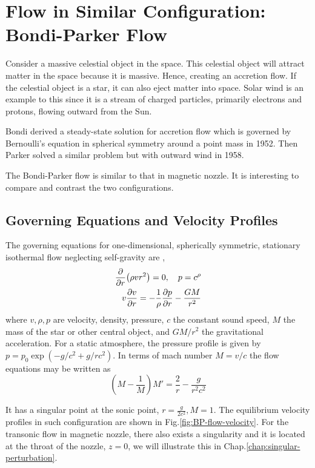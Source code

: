 \section{Flow in Similar Configuration: Bondi-Parker Flow}
Consider a massive celestial object in the space. This celestial object will attract matter in the space because it is massive. Hence, creating an accretion flow. If the celestial object is a star, it can also eject matter into space. Solar wind is an example to this since it is a stream of charged particles, primarily electrons and protons, flowing outward from the Sun.

Bondi derived a steady-state solution for accretion flow which is governed by Bernoulli's equation in spherical symmetry around a point mass in 1952. Then Parker solved a similar problem but with outward wind in 1958. \cite{aikawa_stability_1979,bondi_spherically_1952,keto_stability_2020}

The Bondi-Parker flow is similar to that in magnetic nozzle. It is interesting to compare and contrast the two configurations.

\subsection{Governing Equations and Velocity Profiles}
The governing equations for one-dimensional, spherically symmetric, stationary isothermal flow neglecting self-gravity are \cite{velli_hydrodynamics_2001},
\begin{align*} \label{eq:bondi-parker}
	\pdv{r}(\rho vr^2) = 0, \quad p = c^\rho \\
	v\pdv{v}{r} = -\frac{1}{\rho}\pdv{p}{r} - \frac{GM}{r^2}
\end{align*}
where $v,\rho,p$ are velocity, density, pressure, $c$ the constant sound speed, $M$ the mass of the star or other central object, and $GM/r^2$ the gravitational acceleration. For a static atmosphere, the pressure profile is given by $p=p_0\exp(-g/c^2 + g/rc^2)$. In terms of mach number $M=v/c$ the flow equations may be written as
\[ \left(M - \frac{1}{M}\right)M' = \frac{2}{r} - \frac{g}{r^2c^2} \]

It has a singular point at the sonic point, $r=\frac{g}{2c^2}, M=1$. The equilibrium velocity profiles in such configuration are shown in Fig.\ref{fig:BP-flow-velocity}. For the transonic flow in magnetic nozzle, there also exists a singularity and it is located at the throat of the nozzle, $z=0$, we will illustrate this in Chap.\ref{chap:singular-perturbation}.


